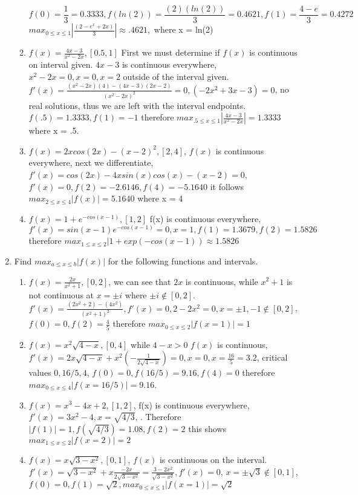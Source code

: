 \documentclass{article}
\begin{document}
\begin{enumerate}
\begin{enumerate}
        $$f(0) = \frac{1}{3} = 0.3333, f(ln(2)) = \frac{(2)(ln(2))}{3} = 0.4621, f(1) = \frac{4-e}{3} = 0.4272$$
        $max_{0 \leq x \leq 1}|\frac{(2-e^{x}+2x)}{3}| \approx .4621,$ where x = ln(2)
        \item $f(x) = \frac{4x-3}{x^2-2x}, [0.5,1]$ First we must determine if $f(x)$ is continuous on interval given. $4x-3$ is continuous everywhere, $x^2-2x = 0, x = 0, x = 2$ outside of the interval given. $f'(x) = \frac{(x^2-2x)(4)-(4x-3)(2x-2)}{(x^2-2x)^2} = 0,  (-2x^2+3x-3) = 0 $, no real solutions, thus we are left with the interval endpoints. 
        $f(.5) = 1.3333, f(1) = -1$ therefore $max_{.5 \leq x \leq 1}|\frac{4x-3}{x^2-2x}| = 1.3333$ where x = .5.
       \item $f(x) = 2xcos(2x) - (x-2)^2, [2,4]$, $f(x)$ is continuous everywhere, next we differentiate, $f'(x) = cos(2x) - 4xsin(x)cos(x) - (x-2) =0$, $f'(x) = 0,f(2) = -2.6146, f(4) = -5.1640$ it follows $max_{2 \leq x \leq 4} |f(x)| = 5.1640$ where x = 4
        \item $f(x) = 1 + e^{-cos(x-1)}, [1,2]$ f(x) is continuous everywhere, $f'(x) = sin(x-1)e^{-cos(x-1)} = 0, x =1, f(1) = 1.3679, f(2) = 1.5826 $ therefore $max_{1 \leq x \leq 2}|1 + exp(-cos(x-1)) \approx 1.5826$
    \end{enumerate}
    \item Find $max_{a \leq x \leq b}|f(x)|$ for the following functions and intervals. 
    \begin{enumerate}
        \item $f(x) = \frac{2x}{x^2+1}, [0,2]$, we can see that $2x$ is continuous, while $x^2+1$ is not continuous at $x = \pm i$ where $\pm i \not \in [0,2]$. $f'(x) = \frac{(2x^2+2) - (4x^2)}{(x^2+1)^2}, f'(x) = 0,2 - 2x^2 = 0, x = \pm 1, -1 \not \in [0,2]$, $f(0) = 0, f(2) = \frac{4}{5}$ therefore $max_{0 \leq x \leq 2}|f(x = 1)| = 1$
        \item $f(x) = x^2\sqrt{4 - x},[0,4]$ while $4-x > 0$ $f(x)$ is continuous, $f'(x) = 2x\sqrt{4-x} + x^2(-\frac{1}{2\sqrt{4-x}}) = 0, x = 0,x = \frac{16}{5} = 3.2$, critical values $0,16/5,4$, $f(0) = 0, f(16/5) = 9.16, f(4) = 0$ therefore $max_{0 \leq x \leq 4 }|f(x = 16/5)| = 9.16$.
        \item $f(x) = x^3 - 4x + 2, [1,2]$, f(x) is continuous everywhere, $f'(x) = 3x^2-4, x = \sqrt{4/3}$, . Therefore $|f(1)| = 1, f(\sqrt{4/3}) = 1.08,f(2) = 2$ this shows $max_{1 \leq x \leq 2} |f(x = 2)| = 2$
        \item $f(x) = x\sqrt{3-x^2}, [0,1]$, $f(x)$ is continuous on the interval. $f'(x) = \sqrt{3-x^2} + x\frac{-2x}{2\sqrt{3-x^2}} = \frac{3-2x^2}{\sqrt{3-x^2}}, f'(x) = 0$, $x = \pm \sqrt{3} \not \in [0,1]$, $f(0) = 0, f(1) = \sqrt{2}, max_{0 \leq x \leq 1}|f(x = 1)| = \sqrt{2}$

\end{enumerate}
\end{enumerate}
\end{document}

